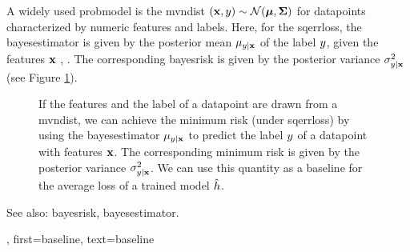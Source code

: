 {{\begin{enumerate}[label=\arabic*)]
   \end{enumerate}
A widely used \gls{probmodel} is the \gls{mvndist} $\left( {\bf x},y \right) \sim \mathcal{N}({\bm \mu},{\bm \Sigma})$ 
for \glspl{datapoint} characterized by numeric \glspl{feature} and \glspl{label}.
Here, for the \gls{sqerrloss}, the \gls{bayesestimator} is given by the posterior 
\gls{mean} $\mu_{y|{\bf x}}$ of the \gls{label} $y$, given the 
\glspl{feature} ${\bf x}$ \cite{LC}, \cite{GrayProbBook}. The corresponding \gls{bayesrisk} 
is given by the posterior \gls{variance} 
$\sigma^{2}_{y|{\bf x}}$ (see Figure \ref{fig_post_baseline_dict}).
	\begin{figure}[H]
		\begin{center}
		\end{center}
		\caption{If the \glspl{feature} and the \gls{label} of a \gls{datapoint} are drawn from a \gls{mvndist}, we 
		can achieve the \gls{minimum} \gls{risk} (under \gls{sqerrloss}) by using the \gls{bayesestimator} $\mu_{y|{\bf x}}$ 
		to predict the \gls{label} $y$ of a \gls{datapoint} with \glspl{feature} ${\bf x}$. The corresponding 
		\gls{minimum} \gls{risk} is given by the posterior \gls{variance} $\sigma^{2}_{y|{\bf x}}$. We can use 
		this quantity as a baseline for the average \gls{loss} of a trained \gls{model} $\hat{h}$. 
		\label{fig_post_baseline_dict}}
	\end{figure}
		See also: \gls{bayesrisk}, \gls{bayesestimator}.},
    first={baseline},
    text={baseline}
}


